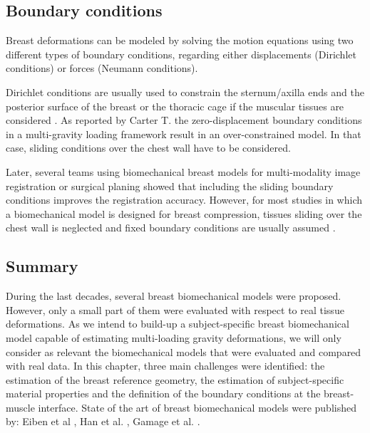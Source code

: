 \subsection{Boundary conditions}

Breast deformations can be modeled by solving the
motion equations using two different types of boundary
conditions, regarding either displacements (Dirichlet conditions) or forces (Neumann conditions).

Dirichlet conditions are usually used to constrain the sternum/axilla ends and the posterior surface of the breast or the thoracic cage if the muscular tissues are considered \citep{griesenauer_breast_2017,rajagopal_creating_2008,pathmanathan_predicting_2008, gamage_modelling_2012,griesenauer_breast_2017}. As reported by Carter T. \citep{carter_biomechanical_2009} the zero-displacement boundary conditions in a multi-gravity loading framework result in an over-constrained model. In that case, sliding conditions over the chest wall have to be considered.    

  Later, several teams using biomechanical breast models for multi-modality image registration or surgical planing showed that including the sliding boundary conditions \citep{georgii_simulation_2016,han_nonlinear_2014}  improves the registration accuracy. However, for most studies in which a biomechanical model is designed for breast compression, tissues sliding over the chest wall is neglected and fixed boundary conditions are usually assumed \citep{sturgeon_finite_element_2016, martinez_finite_2017}.
  
 \subsection{Summary}
 
 During the last decades, several breast biomechanical models were proposed. However, only a small part of them \citep{carter_biomechanical_2009,gamage_modelling_2012,han_nonlinear_2014} were evaluated with respect to real tissue deformations. As we intend to build-up a subject-specific breast biomechanical model capable of estimating multi-loading gravity deformations, we will only consider as relevant the biomechanical models that were evaluated and compared with real data. In this chapter, three main challenges were identified:  the estimation of the breast reference geometry, the estimation of subject-specific material properties and the definition of the boundary conditions at the breast-muscle interface. State of the art of breast biomechanical models were published by:  Eiben et al  \citep{eiben_surface_2016}, Han et al. \citep{han_nonlinear_2014}, Gamage et al. \citep{gamage_modelling_2012}.   

